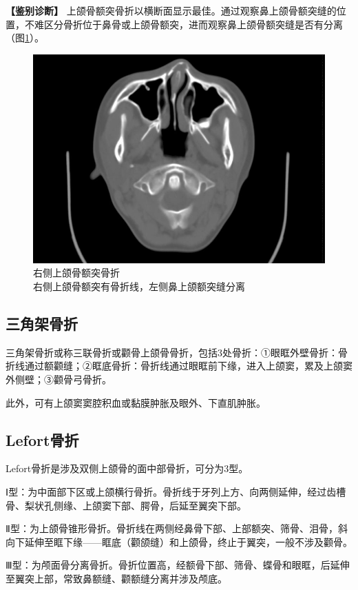 \textbf{【鉴别诊断】}
上颌骨额突骨折以横断面显示最佳。通过观察鼻上颌骨额突缝的位置，不难区分骨折位于鼻骨或上颌骨额突，进而观察鼻上颌骨额突缝是否有分离（图\ref{fig5-3}）。

\begin{figure}[!htbp]
 \centering
 \includegraphics[width=.7\textwidth,height=\textheight,keepaspectratio]{./images/Image00124.jpg}
 \captionsetup{justification=centering}
 \caption{右侧上颌骨额突骨折\\{\small 右侧上颌骨额突有骨折线，左侧鼻上颌额突缝分离}}
 \label{fig5-3}
  \end{figure} 

\subsection{三角架骨折}

三角架骨折或称三联骨折或颧骨上颌骨骨折，包括3处骨折：①眼眶外壁骨折：骨折线通过额颧缝；②眶底骨折：骨折线通过眼眶前下缘，进入上颌窦，累及上颌窦外侧壁；③颧骨弓骨折。

此外，可有上颌窦窦腔积血或黏膜肿胀及眼外、下直肌肿胀。

\subsection{Lefort骨折}

Lefort骨折是涉及双侧上颌骨的面中部骨折，可分为3型。

Ⅰ型：为中面部下区或上颌横行骨折。骨折线于牙列上方、向两侧延伸，经过齿槽骨、梨状孔侧缘、上颌窦下部、腭骨，后延至翼突下部。

Ⅱ型：为上颌骨锥形骨折。骨折线在两侧经鼻骨下部、上部额突、筛骨、泪骨，斜向下延伸至眶下缘------眶底（颧颌缝）和上颌骨，终止于翼突，一般不涉及颧骨。

Ⅲ型：为颅面骨分离骨折。骨折位置高，经额骨下部、筛骨、蝶骨和眼眶，后延伸至翼突上部，常致鼻额缝、颧额缝分离并涉及颅底。

